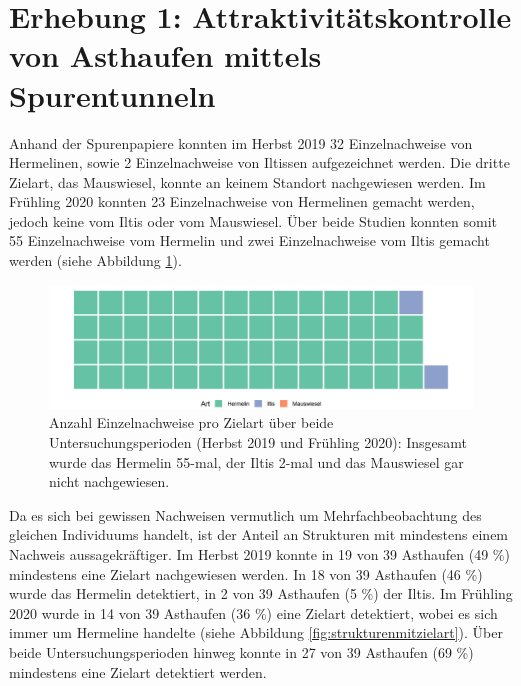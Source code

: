 \documentclass[
]{scrbook}
\begin{document}
\hypertarget{erhebung-1-attraktivituxe4tskontrolle-von-asthaufen-mittels-spurentunneln-1}{%
\section{Erhebung 1: Attraktivitätskontrolle von Asthaufen mittels Spurentunneln}\label{erhebung-1-attraktivituxe4tskontrolle-von-asthaufen-mittels-spurentunneln-1}}

Anhand der Spurenpapiere konnten im Herbst 2019 32 Einzelnachweise von Hermelinen, sowie 2 Einzelnachweise von Iltissen aufgezeichnet werden. Die dritte Zielart, das Mauswiesel, konnte an keinem Standort nachgewiesen werden. Im Frühling 2020 konnten 23 Einzelnachweise von Hermelinen gemacht werden, jedoch keine vom Iltis oder vom Mauswiesel. Über beide Studien konnten somit 55 Einzelnachweise vom Hermelin und zwei Einzelnachweise vom Iltis gemacht werden (siehe Abbildung \ref{fig:wirkungskontrollesystematischeinzelnachweisewaffle}).



\begin{figure}
\includegraphics[width=1\linewidth]{images/wirkungskontrolle_systematisch_einzelnachweise_waffle} \caption{Anzahl Einzelnachweise pro Zielart über beide Untersuchungsperioden (Herbst 2019 und Frühling 2020): Insgesamt wurde das Hermelin 55-mal, der Iltis 2-mal und das Mauswiesel gar nicht nachgewiesen.}\label{fig:wirkungskontrollesystematischeinzelnachweisewaffle}
\end{figure}

Da es sich bei gewissen Nachweisen vermutlich um Mehrfachbeobachtung des gleichen Individuums handelt, ist der Anteil an Strukturen mit mindestens einem Nachweis aussagekräftiger. Im Herbst 2019 konnte in 19 von 39 Asthaufen (49 \%) mindestens eine Zielart nachgewiesen werden. In 18 von 39 Asthaufen (46 \%) wurde das Hermelin detektiert, in 2 von 39 Asthaufen (5 \%) der Iltis. Im Frühling 2020 wurde in 14 von 39 Asthaufen (36 \%) eine Zielart detektiert, wobei es sich immer um Hermeline handelte (siehe Abbildung \ref{fig:strukturenmitzielart}). Über beide Untersuchungsperioden hinweg konnte in 27 von 39 Asthaufen (69 \%) mindestens eine Zielart detektiert werden.
\end{document}

